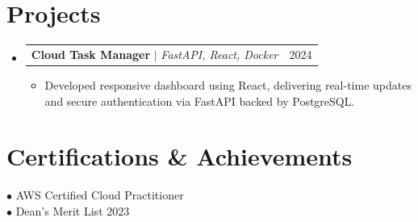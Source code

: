 \documentclass[letterpaper,10pt]{article}
\makeatletter
\newcommand{\resumeItem}[1]{
  \item\small{
    {#1 \vspace{-2pt}}
  }
}
\newcommand{\resumeProjectHeading}[2]{
    \item
    \begin{tabular*}{0.97\textwidth}{l@{\extracolsep{\fill}}r}
      \small#1 & #2 \\
    \end{tabular*}\vspace{-7pt}
}
\newcommand{\resumeSubHeadingListStart}{\begin{itemize}[leftmargin=0.15in, label={}]}
\newcommand{\resumeSubHeadingListEnd}{\end{itemize}}
\newcommand{\resumeItemListStart}{\begin{itemize}}
\newcommand{\resumeItemListEnd}{\end{itemize}\vspace{-5pt}}
\makeatother
\begin{document}
\section{Projects}
    \resumeSubHeadingListStart
              \resumeProjectHeading
          {\textbf{Cloud Task Manager} $|$ \emph{FastAPI, React, Docker}}{2024}
          \resumeItemListStart
                          \resumeItem{Developed responsive dashboard using React, delivering real-time updates and secure authentication via FastAPI backed by PostgreSQL.}
                      \resumeItemListEnd
          \resumeSubHeadingListEnd

\section{Certifications \& Achievements}
  \begin{itemize}[leftmargin=0.15in, label={}]
    \small{\item{
              $\bullet$ AWS Certified Cloud Practitioner \\
                    $\bullet$ Dean's Merit List 2023 \\
          }}
  \end{itemize}
\end{document}
